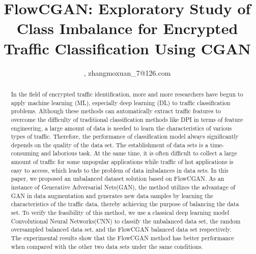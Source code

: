 \documentclass[conference]{IEEEtran}
\begin{document}
	
	\title{FlowCGAN: Exploratory Study of Class Imbalance for Encrypted Traffic Classification Using CGAN}
	
	
	
	
\author{
		,
		zhangmoxuan\_7@126.com}	
\maketitle
	
\begin{abstract}
In the field of encrypted traffic identification, more and more researchers have begun to apply machine learning (ML), especially deep learning (DL) to traffic classification problems. Although these methods can automatically extract traffic features to overcome the difficulty of traditional classification methods like DPI in terms of feature engineering, a large amount of data is needed to learn the characteristics of various types of traffic. Therefore, the performance of classification model always significantly depends on the quality of the data set. The establishment of data sets is a time-consuming and laborious task. At the same time, it is often difficult to collect a large amount of traffic for some unpopular applications while traffic of hot applications is easy to access, which leads to the problem of data imbalances in data sets. In this paper, we proposed an unbalanced dataset solution based on FlowCGAN. As an instance of Generative Adversarial Nets(GAN), the method utilizes the advantage of GAN in data augmentation and generates new data samples by learning the characteristics of the traffic data, thereby achieving the purpose of balancing the data set. To verify the feasibility of this method, we use a classical deep learning model Convolutional Neural Networks(CNN) to classify the unbalanced data set, the random oversampled balanced data set, and the FlowCGAN balanced data set respectively. The experimental results show that the FlowCGAN method has better performance when compared with the other two data sets under the same conditions.
\end{abstract}
\end{document}
